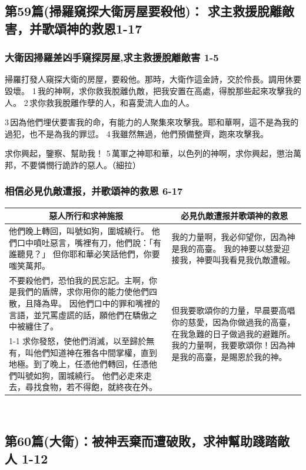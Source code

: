 \subsection{第59篇(掃羅窺探大衛房屋要殺他)： 求主救援脫離敵害，并歌頌神的救恩1-17}
\subsubsection{大衛因掃羅差凶手窺探房屋,求主救援脫離敵害 1-5}
掃羅打發人窺探大衛的房屋，要殺他。那時，大衛作這金詩，交於伶長。調用休要毀壞。
1 我的神啊，求你救我脫離仇敵，把我安置在高處，得脫那些起來攻擊我的人。
2 求你救我脫離作孽的人，和喜愛流人血的人。

3 因為他們埋伏要害我的命，有能力的人聚集來攻擊我。耶和華啊，這不是為我的過犯，也不是為我的罪愆。
4 我雖然無過，他們預備整齊，跑來攻擊我。

求你興起，鑒察、幫助我！
5 萬軍之神耶和華，以色列的神啊，求你興起，懲治萬邦，不要憐憫行詭詐的惡人。（細拉）

\subsubsection{相信必見仇敵遭报，并歌頌神的救恩 6-17}
\begin{table}[H]
\centering
\begin{tabular}{p{10.5cm}|p{6.8cm}}\hline\hline
\multicolumn{1}{c|}{惡人所行和求神施报}&\multicolumn{1}{c}{必見仇敵遭报并歌頌神的救恩}\\\hline
他們晚上轉回，叫號如狗，圍城繞行。
他們口中噴吐惡言，嘴裡有刀，他們說：「有誰聽見？」
但你耶和華必笑話他們，你要嗤笑萬邦。
&我的力量啊，我必仰望你，因為神是我的高臺。
我的神要以慈愛迎接我，神要叫我看見我仇敵遭報。\\\hline
不要殺他們，恐怕我的民忘記。主啊，你是我們的盾牌，求你用你的能力使他們四散，且降為卑。
因他們口中的罪和嘴裡的言語，並咒罵虛謊的話，願他們在驕傲之中被纏住了。
&\multirow{2}{6.9cm}{但我要歌頌你的力量，早晨要高唱你的慈愛，因為你做過我的高臺，在我急難的日子做過我的避難所。
我的力量啊，我要歌頌你！因為神是我的高臺，是賜恩於我的神。}\\\cline{1-1}
求你發怒，使他們消滅，以至歸於無有，叫他們知道神在雅各中間掌權，直到地極。到了晚上，任憑他們轉回，任憑他們叫號如狗，圍城繞行。
他們必走來走去，尋找食物，若不得飽，就終夜在外。&\\\hline
\end{tabular}
\end{table} 


\subsection{第60篇(大衛)：被神丟棄而遭破敗，求神幫助踐踏敵人 1-12}
